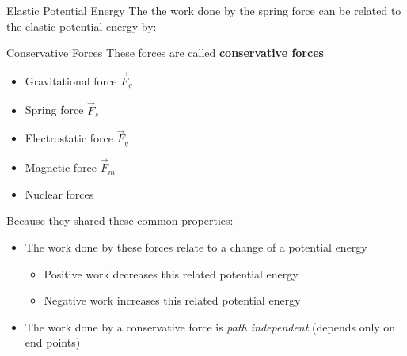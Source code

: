\documentclass[12pt,compress,aspectratio=169]{beamer}
\begin{document}
\begin{frame}{Elastic Potential Energy}
  The the work done by the spring force can be related to the elastic
  potential energy by:
  

\end{frame}



\begin{frame}{Conservative Forces}
  These forces are called \textbf{conservative forces}
  \begin{itemize}
  \item Gravitational force $\vec F_g$
  \item Spring force $\vec F_s$
  \item Electrostatic force $\vec F_q$
  \item Magnetic force $\vec F_m$
  \item Nuclear forces
  \end{itemize}
  Because they shared these common properties:
  \begin{itemize}
  \item The work done by these forces relate to a change of a potential energy
    \begin{itemize}
    \item Positive work decreases this related potential energy
    \item Negative work increases this related potential energy
    \end{itemize}
  \item The work done by a conservative force is \emph{path independent}
    (depends only on end points)
  \end{itemize}
\end{frame}
\end{document}

